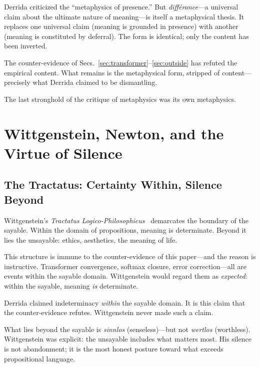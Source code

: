 \documentclass[a4paper,twocolumn,11pt]{article}
\begin{document}
Derrida criticized the ``metaphysics of presence.'' But \emph{diff\'erance}---a universal claim about the ultimate nature of meaning---is itself a metaphysical thesis. It replaces one universal claim (meaning is grounded in presence) with another (meaning is constituted by deferral). The form is identical; only the content has been inverted.

The counter-evidence of Secs.~\ref{sec:transformer}--\ref{sec:outside} has refuted the empirical content. What remains is the metaphysical form, stripped of content---precisely what Derrida claimed to be dismantling.

The last stronghold of the critique of metaphysics was its own metaphysics.



\section{Wittgenstein, Newton, and the Virtue of Silence}
\label{sec:wittgenstein}

\subsection{The Tractatus: Certainty Within, Silence Beyond}

Wittgenstein's \emph{Tractatus Logico-Philosophicus}~\cite{Wittgenstein1921} demarcates the boundary of the sayable. Within the domain of propositions, meaning is determinate. Beyond it lies the unsayable: ethics, aesthetics, the meaning of life.

This structure is immune to the counter-evidence of this paper---and the reason is instructive. Transformer convergence, softmax closure, error correction---all are events within the sayable domain. Wittgenstein would regard them as \emph{expected}: within the sayable, meaning \emph{is} determinate.

Derrida claimed indeterminacy \emph{within} the sayable domain. It is this claim that the counter-evidence refutes. Wittgenstein never made such a claim.

What lies beyond the sayable is \emph{sinnlos} (senseless)---but not \emph{wertlos} (worthless). Wittgenstein was explicit: the unsayable includes what matters most. His silence is not abandonment; it is the most honest posture toward what exceeds propositional language.
\end{document}
